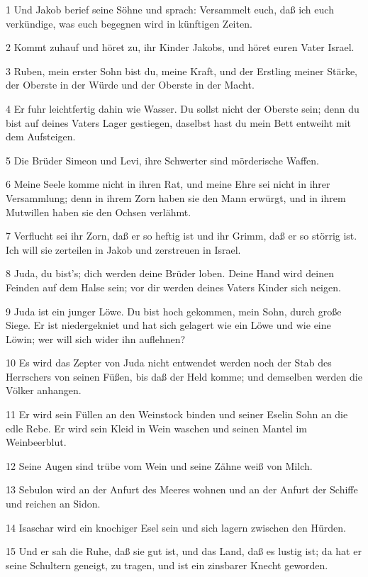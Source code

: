 \par 1 Und Jakob berief seine Söhne und sprach: Versammelt euch, daß ich euch verkündige, was euch begegnen wird in künftigen Zeiten.
\par 2 Kommt zuhauf und höret zu, ihr Kinder Jakobs, und höret euren Vater Israel.
\par 3 Ruben, mein erster Sohn bist du, meine Kraft, und der Erstling meiner Stärke, der Oberste in der Würde und der Oberste in der Macht.
\par 4 Er fuhr leichtfertig dahin wie Wasser. Du sollst nicht der Oberste sein; denn du bist auf deines Vaters Lager gestiegen, daselbst hast du mein Bett entweiht mit dem Aufsteigen.
\par 5 Die Brüder Simeon und Levi, ihre Schwerter sind mörderische Waffen.
\par 6 Meine Seele komme nicht in ihren Rat, und meine Ehre sei nicht in ihrer Versammlung; denn in ihrem Zorn haben sie den Mann erwürgt, und in ihrem Mutwillen haben sie den Ochsen verlähmt.
\par 7 Verflucht sei ihr Zorn, daß er so heftig ist und ihr Grimm, daß er so störrig ist. Ich will sie zerteilen in Jakob und zerstreuen in Israel.
\par 8 Juda, du bist's; dich werden deine Brüder loben. Deine Hand wird deinen Feinden auf dem Halse sein; vor dir werden deines Vaters Kinder sich neigen.
\par 9 Juda ist ein junger Löwe. Du bist hoch gekommen, mein Sohn, durch große Siege. Er ist niedergekniet und hat sich gelagert wie ein Löwe und wie eine Löwin; wer will sich wider ihn auflehnen?
\par 10 Es wird das Zepter von Juda nicht entwendet werden noch der Stab des Herrschers von seinen Füßen, bis daß der Held komme; und demselben werden die Völker anhangen.
\par 11 Er wird sein Füllen an den Weinstock binden und seiner Eselin Sohn an die edle Rebe. Er wird sein Kleid in Wein waschen und seinen Mantel im Weinbeerblut.
\par 12 Seine Augen sind trübe vom Wein und seine Zähne weiß von Milch.
\par 13 Sebulon wird an der Anfurt des Meeres wohnen und an der Anfurt der Schiffe und reichen an Sidon.
\par 14 Isaschar wird ein knochiger Esel sein und sich lagern zwischen den Hürden.
\par 15 Und er sah die Ruhe, daß sie gut ist, und das Land, daß es lustig ist; da hat er seine Schultern geneigt, zu tragen, und ist ein zinsbarer Knecht geworden.
